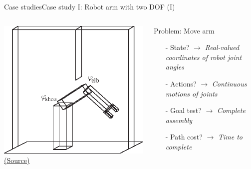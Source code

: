\documentclass[10pt,compress]{beamer} %
\begin{document}
\begin{frame}{Case studies}{Case study I: Robot arm with two DOF (I)}
       \begin{columns}
	            \centering \includegraphics[width=\linewidth]{figs/armPlain.eps}\\
	            \tiny{\href{http://aima.cs.berkeley.edu/index.html}{(Source)}}
                \begin{exampleblock}{Problem: Move arm}
                    \begin{itemize}
                    \item[-] State? $\rightarrow$ \textit{Real-valued coordinates of robot joint angles}
                    \item[-] Actions? $\rightarrow$ \textit{Continuous motions of joints}
                    \item[-] Goal test? $\rightarrow$ \textit{Complete assembly}
                    \item[-] Path cost? $\rightarrow$ \textit{Time to complete}
                    \end{itemize}
                \end{exampleblock}
      \end{columns}
\end{frame}
\end{document}
